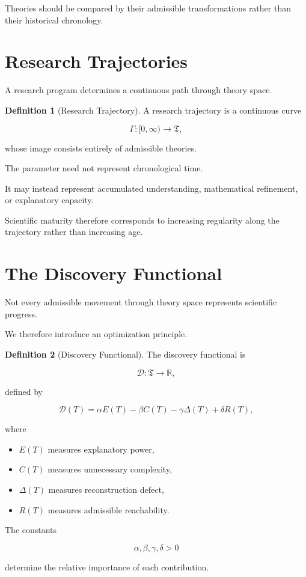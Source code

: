 \documentclass[11pt,oneside]{book}
\numberwithin{equation}{chapter}
\theoremstyle{definition}
\newtheorem{definition}{Definition}[chapter]
\theoremstyle{plain}
\begin{document}
Theories should be compared by their admissible transformations rather than
their historical chronology.

\section{Research Trajectories}

A research program determines a continuous path through theory space.

\begin{definition}[Research Trajectory]

A research trajectory is a continuous curve

\[
\Gamma:
[0,\infty)
\rightarrow
\mathfrak{T},
\]

whose image consists entirely of admissible theories.

\end{definition}

The parameter need not represent chronological time.

It may instead represent accumulated understanding, mathematical refinement,
or explanatory capacity.

Scientific maturity therefore corresponds to increasing regularity along the
trajectory rather than increasing age.

\section{The Discovery Functional}

Not every admissible movement through theory space represents scientific
progress.

We therefore introduce an optimization principle.

\begin{definition}[Discovery Functional]

The discovery functional is

\[
\mathcal{D}
:
\mathfrak{T}
\rightarrow
\mathbb{R},
\]

defined by

\[
\mathcal{D}(T)
=
\alpha
E(T)
-
\beta
C(T)
-
\gamma
\Delta(T)
+
\delta
R(T),
\]

where

\begin{itemize}
\item $E(T)$ measures explanatory power,
\item $C(T)$ measures unnecessary complexity,
\item $\Delta(T)$ measures reconstruction defect,
\item $R(T)$ measures admissible reachability.
\end{itemize}

The constants

\[
\alpha,\beta,\gamma,\delta>0
\]

determine the relative importance of each contribution.

\end{definition}
\end{document}
